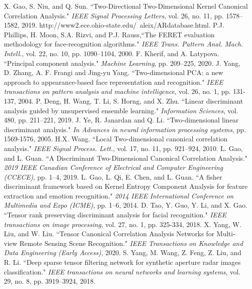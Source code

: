 \documentclass[journal]{IEEEtran}
\begin{document}
\begin{thebibliography}{1}
X. Gao, S. Niu, and Q. Sun. ``Two-Directional Two-Dimensional Kernel Canonical Correlation Analysis." \emph{IEEE Signal Processing Letters}, vol. 26, no. 11, pp. 1578--1582, 2019.
http://www2.ece.ohio-state.edu/~aleix/ARdatabase.html.
P.J. Phillips, H. Moon, S.A. Rizvi, and P.J. Rauss,``The FERET evaluation methodology for face-recognition algorithms." \emph{IEEE Trans. Pattern Anal. Mach. Intell.}, vol. 22, no. 10, pp. 1090--1104, 2000.
F. Kherif, and A. Latypova. ``Principal component analysis." \emph{Machine Learning}, pp. 209--225, 2020.
J. Yang, D. Zhang, A. F. Frangi and Jing-yu Yang. ``Two-dimensional PCA: a new approach to appearance-based face representation and recognition." \emph{IEEE transactions on pattern analysis and machine intelligence}, vol. 26, no. 1, pp. 131-137, 2004.
P. Deng, H. Wang, T. Li, S. Horng, and X. Zhu. ``Linear discriminant analysis guided by unsupervised ensemble learning." \emph{Information Sciences}, vol. 480, pp. 211--221, 2019.
 J. Ye, R. Janardan and Q. Li. ``Two-dimensional linear discriminant analysis." \emph{In Advances in neural information processing systems}, pp. 1569-1576, 2005.
H.X. Wang. ``Local Two-dimensional canonical correlation analysis." \emph{IEEE Signal Process. Lett.}, vol. 17, no. 11, pp. 921--924, 2010.
L. Gao, and L. Guan. ``A Discriminant Two-Dimensional Canonical Correlation Analysis." \emph{2019 IEEE Canadian Conference of Electrical and Computer Engineering (CCECE)}, pp. 1--4, 2019.
L. Gao, L. Qi, E. Chen, and L. Guan. ``A fisher discriminant framework based on Kernel Entropy Component Analysis for feature extraction and emotion recognition." \emph{2014 IEEE International Conference on Multimedia and Expo (ICME)}, pp. 1--6, 2014.
D. Tao, Y. Guo, Y. Li, and X. Gao. ``Tensor rank preserving discriminant analysis for facial recognition." \emph{IEEE transactions on image processing}, vol. 27, no. 1, pp. 325-334, 2018.
X. Yang, W. Liu, and W. Liu. ``Tensor Canonical Correlation Analysis Networks for Multi-view Remote Sensing Scene Recognition." \emph{IEEE Transactions on Knowledge and Data Engineering (Early Access)}, 2020.
S. Yang, M. Wang, Z. Feng, Z. Liu, and R. Li. ``Deep sparse tensor filtering network for synthetic aperture radar images classification." \emph{IEEE transactions on neural networks and learning systems}, vol. 29, no. 8, pp. 3919--3924, 2018.

\end{thebibliography}
\end{document}
